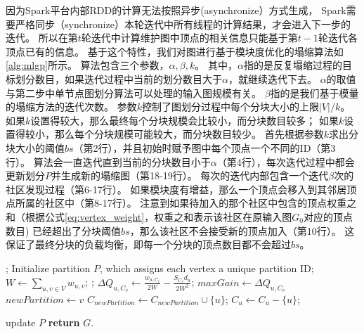 \documentclass[master]{njuthesis}
\begin{document}
因为Spark平台内部RDD的计算无法按照异步(asynchronize）方式生成，
Spark需要严格同步（synchronize）本轮迭代中所有线程的计算结果，才会进入下一步的迭代。
所以在第$t$轮迭代中计算维护图中顶点的相关信息只能基于第$t-1$轮迭代各顶点已有的信息。
基于这个特性，我们对图进行基于模块度优化的塌缩算法如\ref{alg:mlgp}所示。
算法包含三个参数，$\alpha, \beta, k$。
其中，$\alpha$指的是反复塌缩过程的目标划分数目，如果迭代过程中当前的划分数目大于$\alpha$，就继续迭代下去。
$\alpha$的取值与第二步中单节点图划分算法可以处理的输入图规模有关。
$\beta$指的是我们基于模量的塌缩方法的迭代次数。
参数$k$控制了图划分过程中每个分块大小的上限$|V|/k$。
如果$k$设置得较大，那么最终每个分块规模会比较小，而分块数目较多；
如果$k$设置得较小，那么每个分块规模可能较大，而分块数目较少。
首先根据参数$k$求出分块大小的阈值$bs$（第2行），并且初始时赋予图中每个顶点一个不同的ID（第3行）。
算法会一直迭代直到当前的分块数目小于$\alpha$（第4行），每次迭代过程中都会更新划分$P$并生成新的塌缩图（第18-19行）。
每次的迭代内部包含一个迭代$\beta$次的社区发现过程（第6-17行）。
如果模块度有增益，那么一个顶点会移入到其邻居顶点所属的社区中（第8-17行）。
注意到如果待加入的那个社区中包含的顶点权重之和（根据公式\ref{eq:vertex_weight}，权重之和表示该社区在原输入图$G_0$对应的顶点数目)
已经超出了分块阈值$bs$，那么该社区不会接受新的顶点加入（第10行）。
这保证了最终分块的负载均衡，即每一个分块的顶点数目都不会超过$bs$。

\begin{algorithm}[h]
\label{alg:mlgp}
\begin{algorithmic}[1]
  ;
  \State Initialize partition $P$, which assigns each vertex a unique partition ID;
       
	  \State $W \gets \sum\nolimits_{u,v \in V} w_{u,v}$; 
		;
		   
		     \State $\Delta Q_{u,C_{v}} \gets \frac{w_{u,C_v}}{2W} - \frac{S_{C_v}d_u}{2W^2}$;
		      \State $maxGain \gets \Delta Q_{u,C_{v}}$
		      \State $newPartition \gets v$
		     \EndIf
		   \EndIf
		\EndFor
		    \State $C_{newPartition} \gets C_{newPartition}\cup\{u\}$;
		    \State $C_{u} \gets C_{u} - \{u\}$;
		    
		\EndIf	
	    \EndFor
	  \EndFor
	  \State update $P$
	\EndWhile
\State \textbf{return} $G$.
\EndProcedure
\end{algorithmic}
\end{algorithm}
\end{document}

